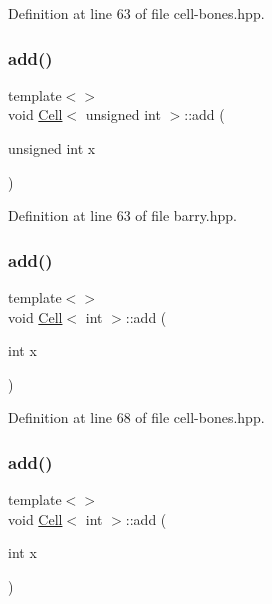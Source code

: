 Definition at line 63 of file cell-\/bones.\+hpp.

\mbox{\label{class_cell_ae22060201cf692bbf219827453d0acd2}} 
\subsubsection{\texorpdfstring{add()}{add()}\hspace{0.1cm}{\footnotesize\ttfamily [5/9]}}
{\footnotesize\ttfamily template$<$$>$ \\
void \hyperlink{class_cell}{Cell}$<$ unsigned int $>$\+::add (\begin{DoxyParamCaption}\item[{unsigned int}]{x }\end{DoxyParamCaption})\hspace{0.3cm}{\ttfamily [inline]}}



Definition at line 63 of file barry.\+hpp.

\mbox{\label{class_cell_a74cb069c7341de33354c396465818c2f}} 
\subsubsection{\texorpdfstring{add()}{add()}\hspace{0.1cm}{\footnotesize\ttfamily [6/9]}}
{\footnotesize\ttfamily template$<$$>$ \\
void \hyperlink{class_cell}{Cell}$<$ int $>$\+::add (\begin{DoxyParamCaption}\item[{int}]{x }\end{DoxyParamCaption})\hspace{0.3cm}{\ttfamily [inline]}}



Definition at line 68 of file cell-\/bones.\+hpp.

\mbox{\label{class_cell_a74cb069c7341de33354c396465818c2f}} 
\subsubsection{\texorpdfstring{add()}{add()}\hspace{0.1cm}{\footnotesize\ttfamily [7/9]}}
{\footnotesize\ttfamily template$<$$>$ \\
void \hyperlink{class_cell}{Cell}$<$ int $>$\+::add (\begin{DoxyParamCaption}\item[{int}]{x }\end{DoxyParamCaption})\hspace{0.3cm}{\ttfamily [inline]}}



